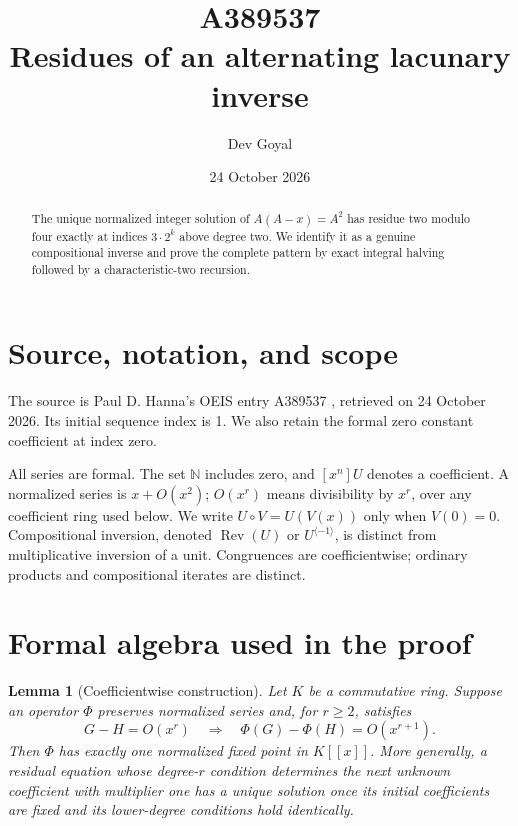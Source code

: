 \documentclass[11pt,a4paper]{article}
\title{A389537\\[4pt]\large Residues of an alternating lacunary inverse}
\author{Dev Goyal}
\date{24 October 2026}
\newtheorem{lemma}[theorem]{Lemma}
\theoremstyle{remark}
\newcommand{\N}{\mathbb N}
\newcommand{\ps}[1]{#1[[x]]}
\newcommand{\Rev}{\operatorname{Rev}}
\newcommand{\rev}{^{\langle-1\rangle}}
\begin{document}
\maketitle
\begin{center}
\end{center}
\begin{abstract}
The unique normalized integer solution of $A(A-x)=A^2$ has residue two modulo four exactly at indices $3\cdot2^k$ above degree two. We identify it as a genuine compositional inverse and prove the complete pattern by exact integral halving followed by a characteristic-two recursion.
\end{abstract}

\section{Source, notation, and scope}

The source is Paul D. Hanna's OEIS entry A389537 \cite{oeis537},
retrieved on 24 October 2026. Its initial sequence index is 1.
We also retain the formal zero constant coefficient at index zero.

All series are formal. The set $\N$ includes zero, and $[x^n]U$ denotes a
coefficient. A normalized series is $x+O(x^2)$; $O(x^r)$ means divisibility
by $x^r$, over any coefficient ring used below. We write $U\circ V=U(V(x))$
only when $V(0)=0$. Compositional inversion, denoted $\Rev(U)$ or $U\rev$,
is distinct from multiplicative inversion of a unit. Congruences are
coefficientwise; ordinary products and compositional iterates are distinct.

\section{Formal algebra used in the proof}

\begin{lemma}[Coefficientwise construction]\label{lem:contraction}
Let $K$ be a commutative ring. Suppose an operator $\Phi$ preserves
normalized series and, for $r\ge2$, satisfies
\[
 G-H=O(x^r)\quad\Longrightarrow\quad
 \Phi(G)-\Phi(H)=O(x^{r+1}).
\]
Then $\Phi$ has exactly one normalized fixed point in $\ps K$.
More generally, a residual equation whose degree-$r$ condition determines
the next unknown coefficient with multiplier one has a unique solution
once its initial coefficients are fixed and its lower-degree conditions
hold identically.
\end{lemma}
\end{document}
